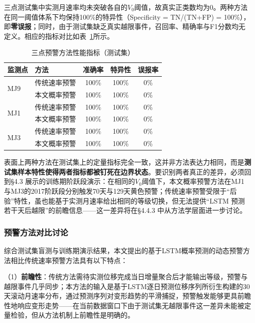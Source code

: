 \documentclass[12pt,a4paper]{article}
\newcommand{\tabcaption}[2]{%
  \caption[#1]{{\CJKfamily{songbold}#1}}}
\begin{document}
三点测试集中实测月速率均未突破各自的$V_0$阈值，故真实正类数均为0。两种方法在同一阈值体系下均保持100\%的特异性（Specificity = TN/(TN+FP) = 100\%），即\textbf{零误报}；同时，由于测试集缺乏真实越限事件，召回率、精确率与F1分数均无定义。相应的指标对比如表~\ref{tab:performance_metrics}所示。

\begin{table}[htbp]
\centering
\tabcaption{三点预警方法性能指标（测试集）}{Performance Metrics at Three Monitoring Points (Test Set)}
\label{tab:performance_metrics}
\begin{tabular}{llccc}
\toprule
监测点 & 方法 & 准确率 & 特异性 & 误报率 \\
\midrule
\multirow{2}{*}{MJ9} & 传统速率预警 & 100\% & 100\% & 0\% \\
                    & 本文概率预警 & 100\% & 100\% & 0\% \\
\midrule
\multirow{2}{*}{MJ1} & 传统速率预警 & 100\% & 100\% & 0\% \\
                    & 本文概率预警 & 100\% & 100\% & 0\% \\
\midrule
\multirow{2}{*}{MJ3} & 传统速率预警 & 100\% & 100\% & 0\% \\
                    & 本文概率预警 & 100\% & 100\% & 0\% \\
\bottomrule
\end{tabular}
\end{table}

表面上两种方法在测试集上的定量指标完全一致，这并非方法表达力相同，而是\textbf{测试集样本特性使得两者指标都被钉死在边界状态}。要识别两者真正的差异，必须回到\S4.3 展示的训练期阶跃段演示：在相同的$V_0$阈值下，本文概率预警方法在MJ1与MJ3的2017阶跃段分别触发70天与129天黄色预警；传统速率预警受限于“后验”特性，虽也能基于实测月速率给出相同的等级切换，但无法提供“LSTM 预测若干天后越限”的前瞻信息——这一差异将在\S4.4.3 中从方法学层面进一步讨论。

\subsubsection{预警方法对比讨论}

综合测试集盲测与训练期演示结果，本文提出的基于LSTM概率预测的动态预警方法相比传统速率预警方法具有以下特点：

    （1）\textbf{前瞻性}：传统方法需待实测位移完成当日增量聚合后才能输出等级，预警与越限事件几乎同步；本方法的输入是基于LSTM逐日预测位移序列所衍生构建的30天滚动月速率分布，通过预测序列对变形趋势的平滑捕捉，预警触发能够更具前瞻性地响应变形走势——在当前数据窗口下由于测试集无越限事件这一差异未能被定量检验，但从方法机制上前瞻性是明确的。
\end{document}
